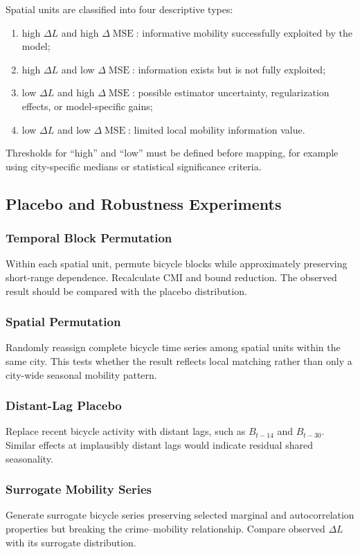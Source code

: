\documentclass[applsci,article,submit,moreauthors]{Definitions/mdpi}
\begin{document}
Spatial units are classified into four descriptive types:
\begin{enumerate}
    \item high $\Delta L$ and high $\Delta\operatorname{MSE}$: informative mobility successfully exploited by the model;
    \item high $\Delta L$ and low $\Delta\operatorname{MSE}$: information exists but is not fully exploited;
    \item low $\Delta L$ and high $\Delta\operatorname{MSE}$: possible estimator uncertainty, regularization effects, or model-specific gains;
    \item low $\Delta L$ and low $\Delta\operatorname{MSE}$: limited local mobility information value.
\end{enumerate}
Thresholds for ``high'' and ``low'' must be defined before mapping, for example using city-specific medians or statistical significance criteria.

\subsection{Placebo and Robustness Experiments}
\label{subsec:robustness_methods}

\subsubsection{Temporal Block Permutation}
Within each spatial unit, permute bicycle blocks while approximately preserving short-range dependence. Recalculate CMI and bound reduction. The observed result should be compared with the placebo distribution.

\subsubsection{Spatial Permutation}
Randomly reassign complete bicycle time series among spatial units within the same city. This tests whether the result reflects local matching rather than only a city-wide seasonal mobility pattern.

\subsubsection{Distant-Lag Placebo}
Replace recent bicycle activity with distant lags, such as $B_{t-14}$ and $B_{t-30}$. Similar effects at implausibly distant lags would indicate residual shared seasonality.

\subsubsection{Surrogate Mobility Series}
Generate surrogate bicycle series preserving selected marginal and autocorrelation properties but breaking the crime--mobility relationship. Compare observed $\Delta L$ with its surrogate distribution.
\end{document}
